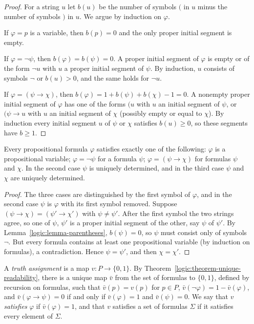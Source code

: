 \begin{proof}
For a string $u$ let $b(u)$ be the number of symbols $($ in $u$ minus the
number of symbols $)$ in $u$. We argue by induction on $\varphi$.

If $\varphi = p$ is a variable, then $b(p) = 0$ and the only proper initial
segment is empty.

If $\varphi = \neg\psi$, then $b(\varphi) = b(\psi) = 0$. A proper initial
segment of $\varphi$ is empty or of the form $\neg u$ with $u$ a proper initial
segment of $\psi$. By induction, $u$ consists of symbols $\neg$ or $b(u) > 0$,
and the same holds for $\neg u$.

If $\varphi = (\psi \to \chi)$, then $b(\varphi) = 1 + b(\psi) + b(\chi) - 1 = 0$.
A nonempty proper initial segment of $\varphi$ has one of the forms $(u$ with
$u$ an initial segment of $\psi$, or $(\psi \to u$ with $u$ an initial segment
of $\chi$ (possibly empty or equal to $\chi$). By induction every initial
segment $u$ of $\psi$ or $\chi$ satisfies $b(u) \geq 0$, so these segments have
$b \geq 1$.
\end{proof}

\begin{theorem}\label{logic:theorem-unique-readability}
Every propositional formula $\varphi$ satisfies exactly one of the following:
$\varphi$ is a propositional variable; $\varphi = \neg\psi$ for a formula
$\psi$; $\varphi = (\psi \to \chi)$ for formulas $\psi$ and $\chi$. In the
second case $\psi$ is uniquely determined, and in the third case $\psi$ and
$\chi$ are uniquely determined.
\end{theorem}

\begin{proof}
The three cases are distinguished by the first symbol of $\varphi$, and in the
second case $\psi$ is $\varphi$ with its first symbol removed. Suppose
$(\psi \to \chi) = (\psi' \to \chi')$ with $\psi \neq \psi'$. After the first
symbol the two strings agree, so one of $\psi$, $\psi'$ is a proper initial
segment of the other, say $\psi$ of $\psi'$. By
Lemma~\ref{logic:lemma-parentheses}, $b(\psi) = 0$, so $\psi$ must consist
only of symbols $\neg$. But every formula contains at least one propositional
variable (by induction on formulas), a contradiction. Hence $\psi = \psi'$,
and then $\chi = \chi'$.
\end{proof}

\begin{definition}\label{logic:definition-truth-assignment}
A \emph{truth assignment} is a map $v \colon P \to \{0, 1\}$. By
Theorem~\ref{logic:theorem-unique-readability}, there is a unique map
$\bar v$ from the set of formulas to $\{0, 1\}$, defined by recursion on
formulas, such that $\bar v(p) = v(p)$ for $p \in P$,
$\bar v(\neg\varphi) = 1 - \bar v(\varphi)$, and
$\bar v(\varphi \to \psi) = 0$ if and only if $\bar v(\varphi) = 1$ and
$\bar v(\psi) = 0$. We say that $v$ \emph{satisfies} $\varphi$ if
$\bar v(\varphi) = 1$, and that $v$ satisfies a set of formulas $\Sigma$ if it
satisfies every element of $\Sigma$.
\end{definition}

